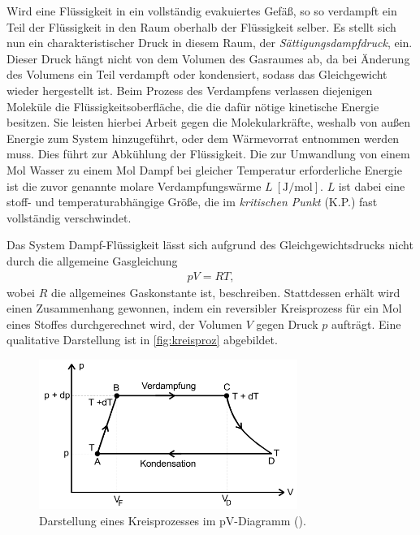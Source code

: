 \noindent
Wird eine Flüssigkeit in ein vollständig evakuiertes Gefäß, so so verdampft ein Teil der Flüssigkeit in den Raum oberhalb der Flüssigkeit
selber. Es stellt sich nun ein charakteristischer Druck in diesem Raum, der \textit{Sättigungsdampfdruck}, ein.
Dieser Druck hängt nicht von dem Volumen des Gasraumes ab, da bei Änderung des Volumens ein Teil verdampft oder kondensiert, sodass das
Gleichgewicht wieder hergestellt ist.
Beim Prozess des Verdampfens verlassen diejenigen Moleküle die Flüssigkeitsoberfläche, die die dafür nötige kinetische Energie besitzen.
Sie leisten hierbei Arbeit gegen die Molekularkräfte, weshalb von außen Energie zum System hinzugeführt, oder dem Wärmevorrat entnommen werden
muss. Dies führt zur Abkühlung der Flüssigkeit. Die zur Umwandlung von einem Mol Wasser zu einem Mol Dampf bei gleicher Temperatur 
erforderliche Energie ist die zuvor genannte molare Verdampfungswärme $L \: [\si{\joule\per\mol}]$.
$L$ ist dabei eine stoff- und temperaturabhängige Größe, die im \textit{kritischen Punkt} (K.P.) fast vollständig verschwindet.



\noindent
Das System Dampf-Flüssigkeit lässt sich aufgrund des Gleichgewichtsdrucks nicht durch die allgemeine Gasgleichung 
\begin{align}
    \label{eqn:gasgl}
    pV = RT,
\end{align}
wobei $R$ die allgemeines Gaskonstante ist, beschreiben. Stattdessen erhält wird einen Zusammenhang gewonnen, indem ein reversibler Kreisprozess
für ein Mol eines Stoffes durchgerechnet wird, der Volumen $V$ gegen Druck $p$ aufträgt. 
Eine qualitative Darstellung ist in \autoref{fig:kreisproz} abgebildet.

\begin{figure}[H]
    \centering
    \includegraphics[width=0.75\textwidth]{daten/Dampfdruckkurve.png}
    \caption{Darstellung eines Kreisprozesses im pV-Diagramm (\cite{anleitung}).}
    \label{fig:kreisproz}
\end{figure}

